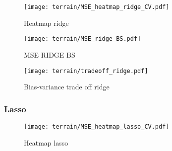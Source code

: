         
        \begin{figure}
            \texttt{[image: terrain/MSE\_heatmap\_ridge\_CV.pdf]}
            \caption{Heatmap ridge}
            \label{fig:gc_gridseach_ridge}
        \end{figure}

        \begin{figure}
            \texttt{[image: terrain/MSE\_ridge\_BS.pdf]}
            \caption{MSE RIDGE BS}
            \label{fig:gc_mse_ridge_bs}
        \end{figure}

        \begin{figure}
            \texttt{[image: terrain/tradeoff\_ridge.pdf]}
            \caption{Bias-variance trade off ridge}
            \label{fig:gc_bias_variance_ridge}
        \end{figure}


        \subsubsection{Lasso}\label{sec:gc_lassoanalysis}

        \begin{figure}
            \texttt{[image: terrain/MSE\_heatmap\_lasso\_CV.pdf]}
            \caption{Heatmap lasso}
            \label{fig:gc_gridseach_lasso}
        \end{figure}

      





    
